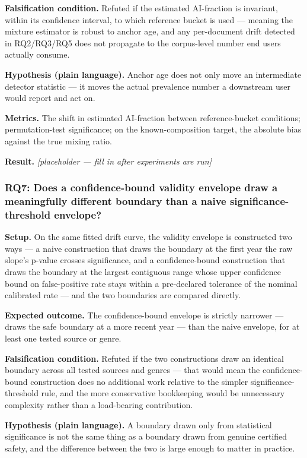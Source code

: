 \documentclass[11pt]{article}
\newcommand{\ph}{\textit{[placeholder --- fill in after experiments are run]}}
\begin{document}
\textbf{Falsification condition.} Refuted if the estimated AI-fraction is invariant, within its confidence interval, to which reference bucket is used --- meaning the mixture estimator is robust to anchor age, and any per-document drift detected in RQ2/RQ3/RQ5 does not propagate to the corpus-level number end users actually consume.

\textbf{Hypothesis (plain language).} Anchor age does not only move an intermediate detector statistic --- it moves the actual prevalence number a downstream user would report and act on.

\textbf{Metrics.} The shift in estimated AI-fraction between reference-bucket conditions; permutation-test significance; on the known-composition target, the absolute bias against the true mixing ratio.

\textbf{Result.} \ph

\subsubsection{RQ7: Does a confidence-bound validity envelope draw a meaningfully different boundary than a naive significance-threshold envelope?}
\textbf{Setup.} On the same fitted drift curve, the validity envelope is constructed two ways --- a naive construction that draws the boundary at the first year the raw slope's p-value crosses significance, and a confidence-bound construction that draws the boundary at the largest contiguous range whose upper confidence bound on false-positive rate stays within a pre-declared tolerance of the nominal calibrated rate --- and the two boundaries are compared directly.

\textbf{Expected outcome.} The confidence-bound envelope is strictly narrower --- draws the safe boundary at a more recent year --- than the naive envelope, for at least one tested source or genre.

\textbf{Falsification condition.} Refuted if the two constructions draw an identical boundary across all tested sources and genres --- that would mean the confidence-bound construction does no additional work relative to the simpler significance-threshold rule, and the more conservative bookkeeping would be unnecessary complexity rather than a load-bearing contribution.

\textbf{Hypothesis (plain language).} A boundary drawn only from statistical significance is not the same thing as a boundary drawn from genuine certified safety, and the difference between the two is large enough to matter in practice.
\end{document}
